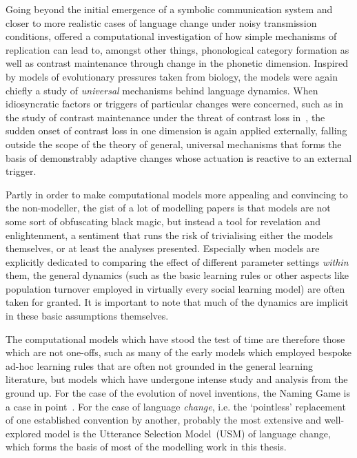 
Going beyond the initial emergence of a symbolic communication system and closer to more realistic cases of language change under noisy transmission conditions,
\citet{Wedel2004,Wedel2006} offered a computational investigation of how simple mechanisms of replication can lead to, amongst other things, phonological category formation as well as contrast maintenance through change in the phonetic dimension. Inspired by models of evolutionary pressures taken from biology, the models were again chiefly a study of \emph{universal} mechanisms behind language dynamics. When idiosyncratic factors or triggers of particular changes were concerned, such as in the study of contrast maintenance under the threat of contrast loss in~\citet{Wedel2006}, the sudden onset of contrast loss in one dimension is again applied externally, falling outside the scope of the theory of general, universal mechanisms that forms the basis of demonstrably adaptive changes whose actuation is reactive to an external trigger.

Partly in order to make computational models more appealing and convincing to the non-modeller, the gist of a lot of modelling papers is that models are not some sort of obfuscating black magic, but instead a tool for revelation and enlightenment, a sentiment that runs the risk of trivialising either the models themselves, or at least the analyses presented. %
Especially when models are explicitly dedicated to comparing the effect of different parameter settings \emph{within} them, the general dynamics (such as the basic learning rules or other aspects like population turnover employed in virtually every social learning model) are often taken for granted. It is important to note that much of the dynamics are implicit in these basic assumptions themselves. 

The computational models which have stood the test of time are therefore those which are not one-offs, such as many of the early models which employed bespoke ad-hoc learning rules that are often not grounded in the general learning literature, but models which have undergone intense study and analysis from the ground up. For the case of the evolution of novel inventions, the Naming Game is a case in point~\citep{Baronchelli2008}. For the case of language \emph{change}, i.e. the `pointless' replacement of one established convention by another, probably the most extensive and well-explored model is the Utterance Selection Model~(USM) of language change, which forms the basis of most of the modelling work in this thesis.

